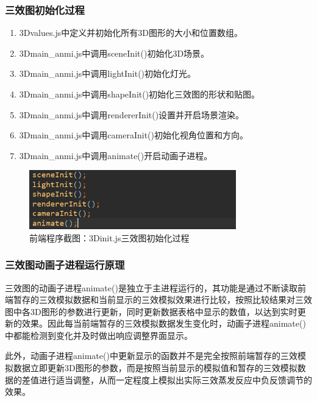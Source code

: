 \documentclass[a4paper]{ctexart}
\begin{document}
\begin{spacing}{1.25}
\subsubsection{三效图初始化过程}
\begin{enumerate}
	\item 3Dvalues.js中定义并初始化所有3D图形的大小和位置数组。
	\item 3Dmain\_anmi.js中调用sceneInit()初始化3D场景。
	\item 3Dmain\_anmi.js中调用lightInit()初始化灯光。
	\item 3Dmain\_anmi.js中调用shapeInit()初始化三效图的形状和贴图。
	\item 3Dmain\_anmi.js中调用rendererInit()设置并开启场景渲染。
	\item 3Dmain\_anmi.js中调用cameraInit()初始化视角位置和方向。
	\item 3Dmain\_anmi.js中调用animate()开启动画子进程。
\end{enumerate}

\begin{figure}[htbp]
	\centering
	\includegraphics [width=0.8\textwidth]{figure//forw3.png}
	\caption{前端程序截图：3Dinit.js三效图初始化过程}
\end{figure}

\subsubsection{三效图动画子进程运行原理}
三效图的动画子进程animate()是独立于主进程运行的，其功能是通过不断读取前端暂存的三效模拟数据和当前显示的三效模拟效果进行比较，按照比较结果对三效图中各3D图形的参数进行更新，同时更新数据表格中显示的数值，以达到实时更新的效果。因此每当前端暂存的三效模拟数据发生变化时，动画子进程animate()中都能检测到变化并及时做出响应调整界面显示。

此外，动画子进程animate()中更新显示的函数并不是完全按照前端暂存的三效模拟数据立即更新3D图形的参数，而是按照当前显示的模拟值和暂存的三效模拟数据的差值进行适当调整，从而一定程度上模拟出实际三效蒸发反应中负反馈调节的效果。

\newpage

\end{spacing}
\end{document}
